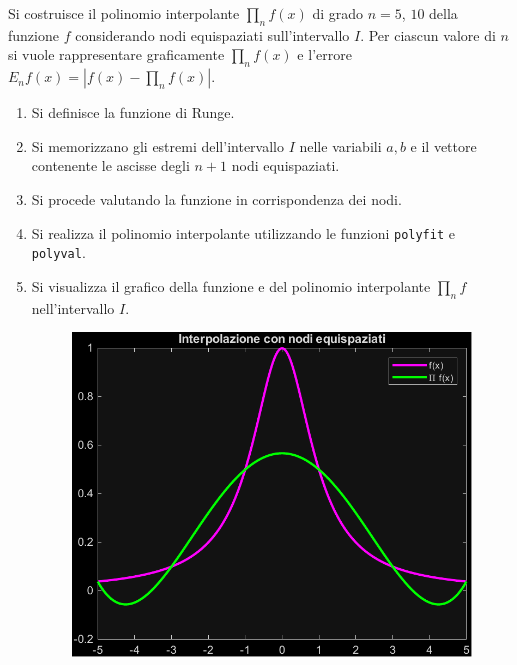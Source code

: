 \highspace
Si costruisce il polinomio interpolante $\prod_{n}f\left(x\right)$ di grado $n = 5$, $10$ della funzione $f$ considerando nodi equispaziati sull'intervallo $I$. Per ciascun valore di $n$ si vuole rappresentare graficamente $\prod_{n}f\left(x\right)$ e l'errore $E_{n}f\left(x\right) = \left|f\left(x\right) - \prod_{n}f\left(x\right)\right|$.
\begin{enumerate}
	\item Si definisce la funzione di Runge.
	
	
	\item Si memorizzano gli estremi dell'intervallo $I$ nelle variabili $a,b$ e il vettore contenente le ascisse degli $n+1$ nodi equispaziati.
	
	
	\item Si procede valutando la funzione in corrispondenza dei nodi.
	
	
	\item Si realizza il polinomio interpolante utilizzando le funzioni \texttt{polyfit} e \texttt{polyval}.
	
	
	\item Si visualizza il grafico della funzione e del polinomio interpolante $\prod_{n}f$ nell'intervallo $I$.
	
	\newpage
	\begin{figure}[!htp]
		\centering
		\includegraphics[width=.7\textwidth]{img/interpolazione-1.pdf}
	\end{figure}
	

\end{enumerate}
